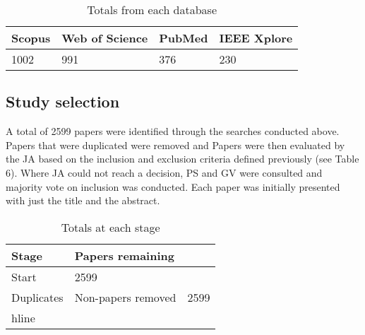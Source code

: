 \documentclass[12pt]{article}
\begin{document}
\begin{table}
	\begin{tabular}{ p{3cm} | p{3cm} | p{3cm} | p{3cm} }
	\hline
	Scopus & Web of Science & PubMed & IEEE Xplore \\ \hline
	1002 & 991 & 376 & 230 \\ 
	\hline
	\end{tabular}
	\caption[Table caption text]{Totals from each database}
	\label{table:name}
\end{table}

\subsection{Study selection}
A total of 2599 papers were identified through the searches conducted above. Papers that were duplicated were removed and Papers were then evaluated by the JA based on the inclusion and exclusion criteria defined previously (see Table 6). Where JA could not reach a decision, PS and GV were consulted and majority vote on inclusion was conducted. Each paper was initially presented with just the title and the abstract.

\begin{table}
	\begin{tabular}{ p{6cm} | p{6cm} }
	\hline
	Stage & Papers remaining\\ \hline
	Start & 2599 \\ \hline
	Duplicates & Non-papers removed & 2599 \\hline 
	\hline
	\end{tabular}
	\caption[Table caption text]{Totals at each stage}
	\label{table:name}
\end{table}
\end{document}
